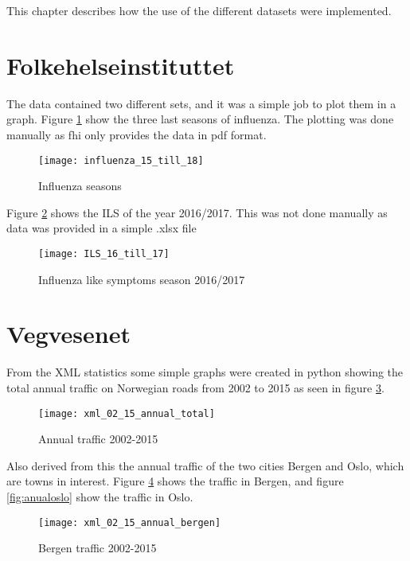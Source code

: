 This chapter describes how the use of the different datasets were implemented.

\section{Folkehelseinstituttet}
The data contained two different sets, and it was a simple job to plot them in a graph. Figure \ref{fig:infstat} show the three last seasons of influenza. The plotting was done manually as fhi only provides the data in pdf format.

\begin{figure}[ht]
\texttt{[image: influenza\_15\_till\_18]}
\centering
\caption{Influenza seasons}
\label{fig:infstat}
\end{figure}

Figure \ref{fig:ilsstat} shows the ILS of the year 2016/2017. This was not done manually as data was provided in a simple .xlsx file 

\begin{figure}[ht]
\texttt{[image: ILS\_16\_till\_17]}
\centering
\caption{Influenza like symptoms season 2016/2017}
\label{fig:ilsstat}
\end{figure}

\newpage

\section{Vegvesenet}
From the XML statistics some simple graphs were created in python showing the total annual traffic on Norwegian roads from 2002 to 2015 as seen in figure \ref{fig:anualtotal}. 

\begin{figure}[ht]
\texttt{[image: xml\_02\_15\_annual\_total]}
\centering
\caption{Annual traffic 2002-2015}
\label{fig:anualtotal}
\end{figure}

Also derived from this the annual traffic of the two cities Bergen and Oslo, which are towns in interest. Figure \ref{fig:anualbergen} shows the traffic in Bergen, and figure \ref{fig:anualoslo} show the traffic in Oslo.

\begin{figure}[ht]
\texttt{[image: xml\_02\_15\_annual\_bergen]}
\centering
\caption{Bergen traffic 2002-2015}
\label{fig:anualbergen}
\end{figure}

